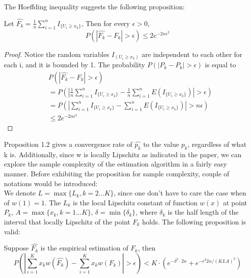 The Hoeffding inequality suggests the following proposition:
\begin{proposition}
Let $\hat{F_k} = \frac{1}{n} \sum_{i=1}^n I_{\{U_i \geq x_k\}}$, Then for every $\epsilon >0$, 
$$P(|\hat{F_k}-F_k| > \epsilon) \leq 2 e^{-2n \epsilon^2} $$
\end{proposition}
\begin{proof}
Notice the random variables $I_{(U_i \geq  x_k) }$ are independent to each other for each i, and it is bounded by 1. 
The probability $P(\left|P_k- P_k \right| > \epsilon)$ is equal to 
\begin{align*}
&
P(\left|\hat{F_k}- F_k \right| > \epsilon) \\ & = P(\left| \frac{1}{n} \sum_{i=1}^n I_{\{U_i \geq
x_k\}} - \frac{1}{n} \sum_{i=1}^n E(I_{\{U_i \geq x_k\}}) \right| > \epsilon) \\ & = P(\left|
\sum_{i=1}^n I_{\{U_i \geq x_k\}} - \sum_{i=1}^n E(I_{\{U_i \geq x_k\}}) \right| > n\epsilon) \\ &
    \leq 2e^{-2n \epsilon^2}
\end{align*}

\end{proof}
Proposition 1.2 gives a convergence rate of $\hat{p_k}$ to the value $p_k$, regardless of what k is. 
Additionally, since w is locally Lipschitz as indicated in the paper, we can explore the sample complexity of the estimation algorithm in a fairly easy manner. 
Before exhibiting the proposition for sample complexity, couple of notations would be introduced: 
\\
We denote $L=\max\{L_k, k=2...K\} $, since one don't have to care the case when of $w(1)=1$. The $L_k$ is the local Lipschitz constant of function $w(x)$ at point 
$P_k$, 
$A=\max\{x_k, k=1...K\}$, $\delta =\min\{\delta_k\}$, where $\delta_k$ is the half length of the interval that locally Lipschitz of the point $F_k$ holds.
The following proposition is valid: 
\begin{proposition}
Suppose $\hat{F_k}$ is the empirical estimation of $F_k$, then 
$$P(\left| \sum_{i=1}^K x_k w(\hat{F_k}) - \sum_{i=1}^K x_k w(F_k) \right| >\epsilon) < K\cdot (
e^{-\delta^2\cdot 2n} + e^{-\epsilon^2 2n/(KLA)^2}) $$ 
\end{proposition}

